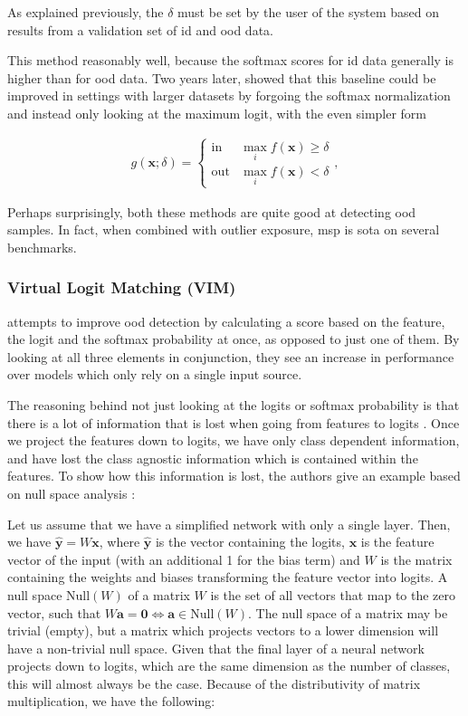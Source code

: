 \documentclass[UKenglish]{uiomasterthesis} %
\theoremstyle{definition}
\begin{document}
As explained previously, the $\delta$ must be set by the user of the system based on results from a validation set of \ac{id} and \ac{ood} data.

This method reasonably well, because the softmax scores for \ac{id} data generally is higher than for \ac{ood} data. Two years later, \cite{mls} showed that this baseline could be improved in settings with larger datasets by forgoing the softmax normalization and instead only looking at the maximum logit, with the even simpler form

\begin{align}
\label{eq:mls}
    g(\bm{x}; \delta)=\begin{cases} 
        \text{in } & \max_i f(\bm{x})\ge \delta \\
        \text{out} & \max_i f(\bm{x}) < \delta 
   \end{cases},
\end{align}

Perhaps surprisingly, both these methods are quite good at detecting \ac{ood} samples. In fact, when combined with outlier exposure, \ac{msp} is \ac{sota} on several benchmarks.

\subsubsection{Virtual Logit Matching (VIM)} \label{section:vim}

\cite{vim} attempts to improve \ac{ood} detection by calculating a score based on the feature, the logit and the softmax probability at once, as opposed to just one of them. By looking at all three elements in conjunction, they see an increase in performance over models which only rely on a single input source.

The reasoning behind not just looking at the logits or softmax probability is that there is a lot of information that is lost when going from features to logits \cite{vim}. Once we project the features down to logits, we have only class dependent information, and have lost the class agnostic information which is contained within the features. To show how this information is lost, the authors give an example based on null space analysis \cite{nusa}:

Let us assume that we have a simplified network with only a single layer. Then, we have $\hat{\bm{y}} = W \bm{x}$, where $\hat{\bm{y}}$ is the vector containing the logits, $\bm{x}$ is the feature vector of the input (with an additional 1 for the bias term) and $W$ is the matrix containing the weights and biases transforming the feature vector into logits. A null space $\text{Null}(W)$ of a matrix $W$ is the set of all vectors that map to the zero vector, such that $W \bm{a} = \bm{0} \iff \bm{a} \in \text{Null}(W)$. The null space of a matrix may be trivial (empty), but a matrix which projects vectors to a lower dimension will have a non-trivial null space. Given that the final layer of a neural network projects down to logits, which are the same dimension as the number of classes, this will almost always be the case. Because of the distributivity of matrix multiplication, we have the following:
\end{document}
